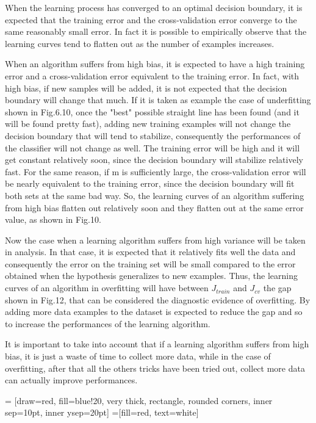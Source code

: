 \documentclass[aps,letterpaper,10pt]{revtex4}
\begin{document}
When the learning process has converged to an optimal decision boundary, it is expected that the training error and the cross-validation error converge to the same reasonably small error. In fact it is possible to empirically observe that the learning curves tend to flatten out as the number of examples increases. 

When an algorithm suffers from high bias, it is expected to have a high training error and a cross-validation error equivalent to the training error. In fact, with high bias, if new samples will be added, it is not expected that the decision boundary will change that much. If it is taken as example the case of underfitting shown in Fig.6.10, once the "best" possible straight line has been found (and it will be found pretty fast), adding new training examples will not change the decision boundary that will tend to stabilize, consequently the performances of the classifier will not change as well. The training error will be high and it will get constant relatively soon, since the decision boundary will stabilize relatively fast. For the same reason, if m is sufficiently large, the cross-validation error will be nearly equivalent to the training error, since the decision boundary will fit both sets at the same bad way. So, the learning curves of an algorithm suffering from high bias flatten out relatively soon and they flatten out at the same error value, as shown in Fig.10. 

Now the case when a learning algorithm suffers from high variance will be taken in analysis. In that case, it is expected that it relatively fits well the data and consequently the error on the training set will be small compared to the error obtained when the hypothesis generalizes to new examples. Thus, the learning curves of an algorithm in overfitting will have between $J_{train}$ and $J_{cv}$ the gap shown in Fig.12, that can be considered the diagnostic evidence of overfitting. By adding more data examples to the dataset is expected to reduce the gap and so to increase the performances of the learning algorithm. 

It is important to take into account that if a learning algorithm suffers from high bias, it is just a waste of time to collect more data, while in the case of overfitting, after that all the others tricks have been tried out, collect more data can actually improve performances.

 = [draw=red, fill=blue!20, very thick,
    rectangle, rounded corners, inner sep=10pt, inner ysep=20pt]
 =[fill=red, text=white]
\end{document}
